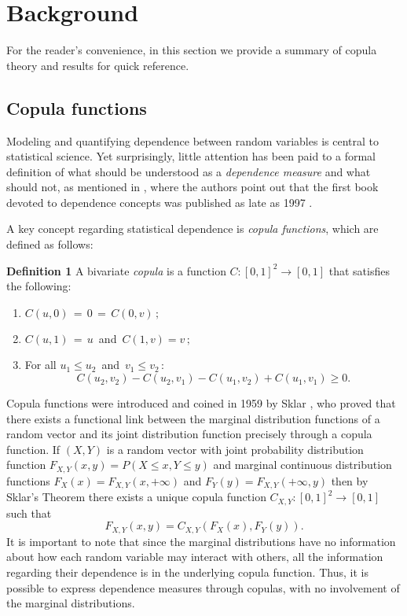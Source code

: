 \documentclass[journal]{vgtc}                %
\begin{document}
\section{Background}
\label{sec:background}

For the reader's convenience, in this section we provide a summary of copula theory and results for quick reference.

\subsection{Copula functions}

Modeling and quantifying dependence between random variables is central to statistical science. Yet surprisingly, little attention has been paid to a formal definition of what should be understood as a \textit{dependence measure} and what should not, as mentioned in \cite{Kotz2001}, where the authors point out that the first book devoted to dependence concepts was published as late as 1997 \cite{Joe1997}.

A key concept regarding statistical dependence is \textit{copula functions}, which are defined as follows:

\textbf{Definition 1} A bivariate \textit{copula} is a function $C:[0,1]^2\rightarrow[0,1]$ that satisfies the following:
\begin{enumerate}
    \item $C(u,0)\,=\,0\,=\,C(0,v)\,;$
    \item $C(u,1)\,=\,u\,$ and $\,C(1,v)=v\,;$
    \item For all $u_1\leq u_2\,$ and $\,v_1\leq v_2\,:$ $$C(u_2,v_2)-C(u_2,v_1)-C(u_1,v_2)+C(u_1,v_1)\geq 0.$$
\end{enumerate}

Copula functions were introduced and coined in 1959 by Sklar \cite{Sklar1959}, who proved that there exists a functional link between the marginal distribution functions of a random vector and its joint distribution function precisely through a copula function. If $(X,Y)$ is a random vector with joint probability distribution function $F_{X,Y}(x,y)=P(X\leq x,Y\leq y)$ and marginal continuous distribution functions $F_X(x)=F_{X,Y}(x,+\infty)$ and $F_Y(y)=F_{X,Y}(+\infty,y)$ then by Sklar's Theorem \cite{Sklar1959} there exists a unique copula function $C_{X,Y}:[0,1]^2\rightarrow[0,1]$ such that
\begin{equation}\label{eq:SklarThm}
  F_{X,Y}(x,y) = C_{X,Y}(F_X(x),F_Y(y)).
\end{equation}
It is important to note that since the marginal distributions have no information about how each random variable may interact with others, all the information regarding their dependence is in the underlying copula function. Thus, it is possible to express dependence measures through copulas, with no involvement of the marginal distributions.
\end{document}
